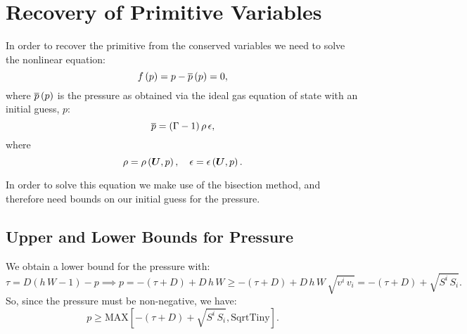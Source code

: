 \section{Recovery of Primitive Variables}
In order to recover the primitive from the conserved variables we need to solve the nonlinear equation:
\begin{equation}
    f\left(p\right)=p-\overline{p}\left(p\right)=0,
\end{equation}
where $\overline{p}\left(p\right)$ is the pressure as obtained via the ideal gas equation of state with an initial guess, $p$:
\begin{equation}
    \overline{p}=\left(\Gamma-1\right)\rho\,\epsilon,
\end{equation}
where
\begin{equation}
    \rho=\rho\left(\boldsymbol{U},p\right),\hspace{1em}\epsilon=\epsilon\left(\boldsymbol{U},p\right).
\end{equation}

In order to solve this equation we make use of the bisection method, and therefore need bounds on our initial guess for the pressure.

\subsection{Upper and Lower Bounds for Pressure}
We obtain a lower bound for the pressure with:
\begin{equation}
\tau=D\left(h\,W-1\right)-p\implies p=-\left(\tau+D\right)+D\,h\,W\geq-\left(\tau+D\right)+D\,h\,W\,\sqrt{v^{i}\,v_{i}}=-\left(\tau+D\right)+\sqrt{S^{i}\,S_{i}}.
\end{equation}
So, since the pressure must be non-negative, we have:
\begin{equation}
p\geq\text{MAX}\left[-\left(\tau+D\right)+\sqrt{S^{i}\,S_{i}},\text{SqrtTiny}\right].
\end{equation}

